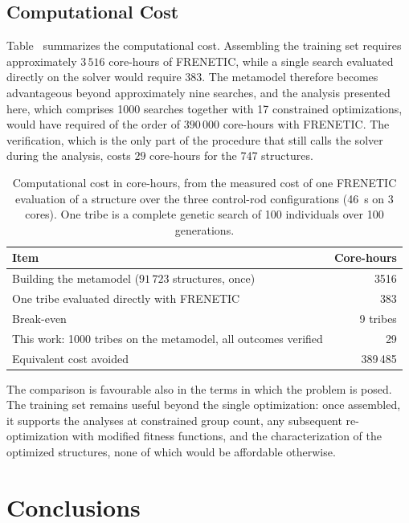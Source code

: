 \subsection{Computational Cost}

Table~ summarizes the computational cost. Assembling the
training set requires approximately $3\,516$ core-hours of FRENETIC, while a
single search evaluated directly on the solver would require $383$. The
metamodel therefore becomes advantageous beyond approximately nine searches, and
the analysis presented here, which comprises 1000 searches together with
17 constrained optimizations, would have required of the order of
$390\,000$ core-hours with FRENETIC. The verification, which is the only part of
the procedure that still calls the solver during the analysis, costs $29$
core-hours for the 747 structures.

\begin{table}[htbp]
\centering
\caption[Computational cost in core-hours]{Computational cost in core-hours, from the measured cost of one
FRENETIC evaluation of a structure over the three control-rod configurations
(46~s on 3 cores). One tribe is a complete genetic
search of 100 individuals over 100 generations.}
\label{eg:tab:cost}
\begin{tabular}{lr}
\toprule
Item & Core-hours \\ \midrule
Building the metamodel ($91\,723$ structures, once) & 3516 \\
One tribe evaluated directly with FRENETIC & 383 \\
Break-even & 9 tribes \\ \midrule
This work: 1000 tribes on the metamodel, all outcomes verified & 29 \\
Equivalent cost avoided & 389\,485 \\ \bottomrule
\end{tabular}
\end{table}

The comparison is favourable also in the terms in which the problem is posed.
The training set remains useful beyond the single optimization: once
assembled, it supports the analyses at constrained group count, any subsequent
re-optimization with modified fitness functions, and the characterization of the
optimized structures, none of which would be affordable otherwise.

\section{Conclusions}

